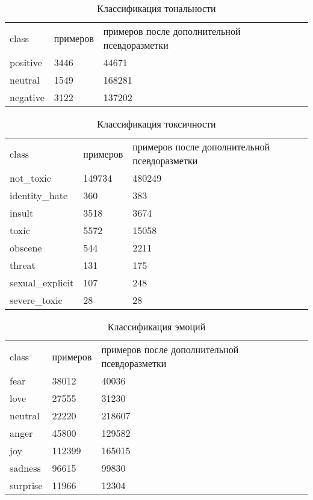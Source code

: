 \begin{table}[]
\caption{Классификация тональности}
\label{appendix:sentiment}
\begin{tabular}{lll}
class & примеров & примеров после дополнительной псевдоразметки \\
positive & 3446 & 44671 \\
neutral & 1549 & 168281 \\
negative & 3122 & 137202
\end{tabular}
\end{table}


\begin{table}[]
\caption{Классификация токсичности}
\label{appendix:toxic}
\begin{tabular}{lll}
class & примеров & примеров после дополнительной псевдоразметки \\
not\_toxic & 149734 & 480249 \\
identity\_hate & 360 & 383 \\
insult & 3518 & 3674 \\
toxic & 5572 & 15058 \\
obscene & 544 & 2211 \\
threat & 131 & 175 \\
sexual\_explicit & 107 & 248 \\
severe\_toxic & 28 & 28
\end{tabular}
\end{table}


\begin{table}[]
\caption{Классификация эмоций}
\label{appendix:emo}
\begin{tabular}{lll}
class & примеров & примеров после дополнительной псевдоразметки \\
fear & 38012 & {40036} \\
love & 27555 & {31230} \\
neutral & 22220 & {218607} \\
anger & 45800 & 129582 \\
joy & 112399 & 165015 \\
sadness & 96615 & 99830 \\
surprise & 11966 & 12304
\end{tabular}
\end{table}


